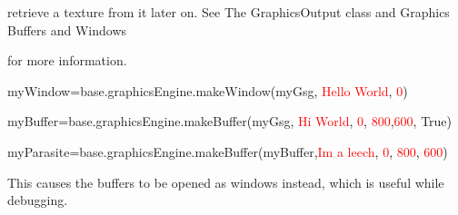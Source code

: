 \documentclass[a4paper]{article}
\newcommand\textstyleOOoComputerIdent[1]{\textrm{\textcolor[rgb]{0.0,0.5019608,0.0}{#1}}}
\newcommand\textstyleOOoComputerBase[1]{\textrm{\textcolor{black}{#1}}}
\newcommand\textstyleOOoComputerLiteral[1]{\textrm{\textcolor{red}{#1}}}
\begin{document}
{\color{black}
retrieve a texture from it later on. See The GraphicsOutput class and Graphics Buffers and Windows}

{\color{black}
for more information.}


\bigskip

{\ttfamily\color{black}
\textstyleOOoComputerIdent{myWindow}\textstyleOOoComputerBase{=}\textstyleOOoComputerIdent{base}\textstyleOOoComputerBase{.}\textstyleOOoComputerIdent{graphicsEngine}\textstyleOOoComputerBase{.}\textstyleOOoComputerIdent{makeWindow}\textstyleOOoComputerBase{(}\textstyleOOoComputerIdent{myGsg}\textstyleOOoComputerBase{,}
\textstyleOOoComputerLiteral{{\textquotedbl}Hello World{\textquotedbl}}\textstyleOOoComputerBase{,}
\textstyleOOoComputerLiteral{0}\textstyleOOoComputerBase{)}}

{\ttfamily\color{black}
\textstyleOOoComputerIdent{myBuffer}\textstyleOOoComputerBase{=}\textstyleOOoComputerIdent{base}\textstyleOOoComputerBase{.}\textstyleOOoComputerIdent{graphicsEngine}\textstyleOOoComputerBase{.}\textstyleOOoComputerIdent{makeBuffer}\textstyleOOoComputerBase{(}\textstyleOOoComputerIdent{myGsg}\textstyleOOoComputerBase{,}
\textstyleOOoComputerLiteral{{\textquotedbl}Hi World{\textquotedbl}}\textstyleOOoComputerBase{,}
\textstyleOOoComputerLiteral{0}\textstyleOOoComputerBase{,}
\textstyleOOoComputerLiteral{800}\textstyleOOoComputerBase{,}\textstyleOOoComputerLiteral{600}\textstyleOOoComputerBase{,}
\textstyleOOoComputerIdent{True}\textstyleOOoComputerBase{)}}

{\ttfamily\color{black}
\textstyleOOoComputerIdent{myParasite}\textstyleOOoComputerBase{=}\textstyleOOoComputerIdent{base}\textstyleOOoComputerBase{.}\textstyleOOoComputerIdent{graphicsEngine}\textstyleOOoComputerBase{.}\textstyleOOoComputerIdent{makeBuffer}\textstyleOOoComputerBase{(}\textstyleOOoComputerIdent{myBuffer}\textstyleOOoComputerBase{,}\textstyleOOoComputerLiteral{{\textquotedbl}Im
a leech{\textquotedbl}}\textstyleOOoComputerBase{,} \textstyleOOoComputerLiteral{0}\textstyleOOoComputerBase{,}
\textstyleOOoComputerLiteral{800}\textstyleOOoComputerBase{,}
\textstyleOOoComputerLiteral{600}\textstyleOOoComputerBase{)}}


\bigskip


{\color{black}
This causes the buffers to be opened as windows instead, which is useful while debugging.}


\bigskip
\end{document}
